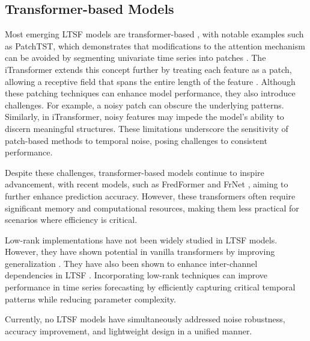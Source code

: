 
\subsection{Transformer-based Models} \label{sub sec: related works transformers}
Most emerging \ac{LTSF} models are transformer-based \cite{liu2024deep}, with notable examples such as PatchTST, which demonstrates that modifications to the attention mechanism can be avoided by segmenting univariate time series into patches \cite{nie2022time}. The iTransformer extends this concept further by treating each feature as a patch, allowing a receptive field that spans the entire length of the feature \cite{liu2023itransformer}. Although these patching techniques can enhance model performance, they also introduce challenges. For example, a noisy patch can obscure the underlying patterns. Similarly, in iTransformer, noisy features may impede the model's ability to discern meaningful structures. These limitations underscore the sensitivity of patch-based methods to temporal noise, posing challenges to consistent performance.

Despite these challenges, transformer-based models continue to inspire advancement, with recent models, such as FredFormer \cite{piao2024fredformer} and FrNet \cite{zhang2024frnet}, aiming to further enhance prediction accuracy. However, these transformers often require significant memory and computational resources, making them less practical for scenarios where efficiency is critical.

Low-rank implementations have not been widely studied in \ac{LTSF} models. However, they have shown potential in vanilla transformers by improving generalization \cite{hu2021lora,zhang2023adalora,valipour2022dylora}. They have also been shown to enhance inter-channel dependencies in \ac{LTSF} \cite{nie2024channel}. Incorporating low-rank techniques can improve performance in time series forecasting by efficiently capturing critical temporal patterns while reducing parameter complexity.

Currently, no \ac{LTSF} models have simultaneously addressed noise robustness, accuracy improvement, and lightweight design in a unified manner.